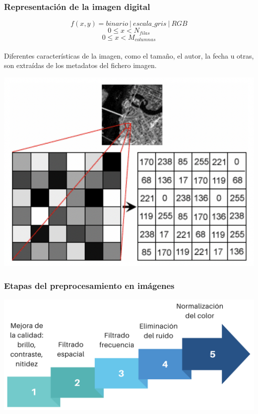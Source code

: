 \documentclass[
10pt, %
aspectratio=169, %
]{beamer}
\begin{document}
	\begin{frame}
		
		\frametitle{Representación de la imagen digital}
		
		\noindent\begin{minipage}{.5\textwidth}
			$$f(x, y) = binario\ |\ escala\_gris\ |\ RGB$$
			$$0 \leq x < N_{filas} $$
			$$0 \leq x < M_{columnas} $$ \\[2mm]
			
			Diferentes características de la imagen, como el tamaño, el autor, la fecha u otras, son extraídas de los metadatos del fichero imagen.
			
		\end{minipage}%
		\begin{minipage}{.55\textwidth}
			\centering
			\includegraphics[scale=0.5]{coordenadas.png} 
		\end{minipage}
		
	\end{frame}
	
	\begin{frame}
		
		\frametitle{Etapas del preprocesamiento en imágenes}
		
		\centering
		\includegraphics[scale=0.6]{preprocesamiento.png} 
		
	\end{frame}
	
\end{document}
